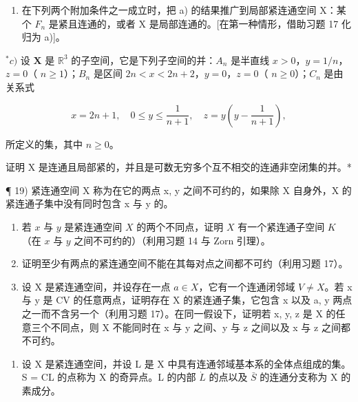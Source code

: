 \begin{enumerate}
\def\labelenumi{\alph{enumi})}
\setcounter{enumi}{1}
\tightlist
\item
  在下列两个附加条件之一成立时，把 a) 的结果推广到局部紧连通空间 X：某个 \(F_{n}\) 是紧且连通的，或者 X 是局部连通的。{[}在第一种情形，借助习题 17 化归为 a){]}。
\end{enumerate}

\(^{*}c)\) 设 \(\mathbf{X}\) 是 \(\mathbb{R}^3\) 的子空间，它是下列子空间的并：\(A_n\) 是半直线 \(x > 0\)，\(y = 1/n\)，\(z = 0\)（ \(n \geqslant 1\)）；\(B_n\) 是区间 \(2n < x < 2n + 2\)，\(y = 0\)，\(z = 0\)（ \(n \geqslant 0\)）；\(C_n\) 是由关系式

\[
x = 2 n + 1, \quad 0 \leqslant y \leqslant \frac {1}{n + 1}, \quad z = y \left(y - \frac {1}{n + 1}\right),
\]

所定义的集，其中 \(n \geqslant 0\)。

证明 X 是连通且局部紧的，并且是可数无穷多个互不相交的连通非空闭集的并。*

¶ 19) 紧连通空间 X 称为在它的两点 x, y 之间不可约的，如果除 X 自身外，X 的紧连通子集中没有同时包含 x 与 y 的。

\begin{enumerate}
\def\labelenumi{\alph{enumi})}
\item
  若 \(x\) 与 \(y\) 是紧连通空间 \(X\) 的两个不同点，证明 \(X\) 有一个紧连通子空间 \(K\)（在 \(x\) 与 \(y\) 之间不可约的）（利用习题 14 与 Zorn 引理）。
\item
  证明至少有两点的紧连通空间不能在其每对点之间都不可约（利用习题 17）。
\item
  设 X 是紧连通空间，并设存在一点 \(a \in X\)，它有一个连通闭邻域 \(V \neq X\)。若 x 与 y 是 CV 的任意两点，证明存在 X 的紧连通子集，它包含 x 以及 a, y 两点之一而不含另一个（利用习题 17）。在同一假设下，证明若 x, y, z 是 X 的任意三个不同点，则 X 不能同时在 x 与 y 之间、y 与 z 之间以及 x 与 z 之间都不可约。
\end{enumerate}

\begin{enumerate}
\def\labelenumi{\arabic{enumi})}
\setcounter{enumi}{19}
\tightlist
\item
  设 X 是紧连通空间，并设 L 是 X 中具有连通邻域基本系的全体点组成的集。S = CL 的点称为 X 的奇异点。L 的内部 \(\dot{L}\) 的点以及 \(\bar{S}\) 的连通分支称为 X 的素成分。
\end{enumerate}

